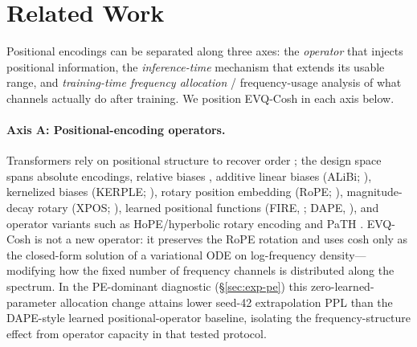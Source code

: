 \section{Related Work}

Positional encodings can be separated along three axes: the \emph{operator} that injects positional information, the \emph{inference-time} mechanism that extends its usable range, and \emph{training-time frequency allocation} / frequency-usage analysis of what channels actually do after training. We position EVQ-Cosh in each axis below.

\paragraph{Axis A: Positional-encoding operators.}
Transformers rely on positional structure to recover order \citep{vaswani2017attention}; the design space spans absolute encodings, relative biases \citep{shaw2018self, raffel2020exploring}, additive linear biases (ALiBi; \citealp{press2022alibi}), kernelized biases (KERPLE; \citealp{chi2022kerple}), rotary position embedding (RoPE; \citealp{su2024roformer}), magnitude-decay rotary (XPOS; \citealp{sun2022xpos}), learned positional functions (FIRE, \citealp{li2024fire}; DAPE, \citealp{zheng2024dape}), and operator variants such as HoPE/hyperbolic rotary encoding \citep{dai2025hyperbolicrope} and PaTH \citep{yang2025pathattention}. EVQ-Cosh is not a new operator: it preserves the RoPE rotation and uses cosh only as the closed-form solution of a variational ODE on log-frequency density---modifying how the fixed number of frequency channels is distributed along the spectrum. In the PE-dominant diagnostic (\S\ref{sec:exp-pe}) this zero-learned-parameter allocation change attains lower seed-42 extrapolation PPL than the DAPE-style learned positional-operator baseline, isolating the frequency-structure effect from operator capacity in that tested protocol.

